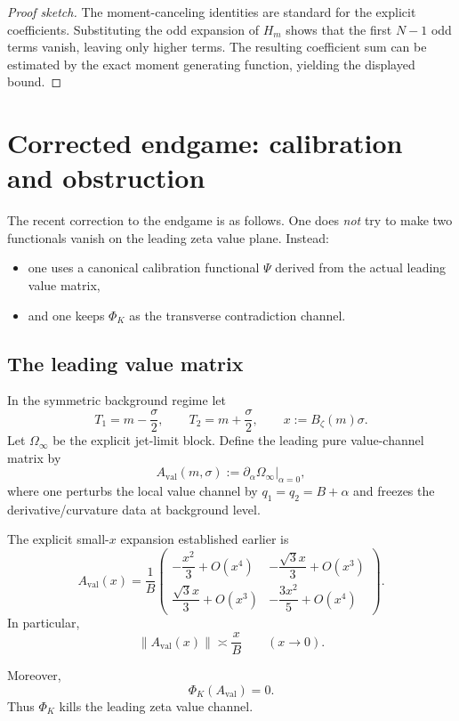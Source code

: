 \documentclass[11pt]{article}
\theoremstyle{plain}
\theoremstyle{definition}
\newcommand{\Psical}{\Psi}
\newcommand{\val}{\mathrm{val}}
\newcommand{\Aval}{A_{\val}}
\newcommand{\norm}[1]{\left\lVert #1\right\rVert}
\begin{document}
\begin{proof}[Proof sketch]
The moment-canceling identities are standard for the explicit coefficients. Substituting the odd expansion of $H_m$ shows that the first $N-1$ odd terms vanish, leaving only higher terms. The resulting coefficient sum can be estimated by the exact moment generating function, yielding the displayed bound.
\end{proof}

\section{Corrected endgame: calibration and obstruction}

The recent correction to the endgame is as follows. One does \emph{not} try to make two functionals vanish on the leading zeta value plane. Instead:

\begin{itemize}[nosep]
\item one uses a canonical calibration functional $\Psical$ derived from the actual leading value matrix,
\item and one keeps $\Phi_K$ as the transverse contradiction channel.
\end{itemize}

\subsection{The leading value matrix}

In the symmetric background regime let
\[
T_1=m-\frac{\sigma}{2},\qquad T_2=m+\frac{\sigma}{2},\qquad x:=B_\zeta(m)\sigma.
\]
Let $\Omega_\infty$ be the explicit jet-limit block. Define the leading pure value-channel matrix by
\[
\Aval(m,\sigma):=\partial_\alpha \Omega_\infty\big|_{\alpha=0},
\]
where one perturbs the local value channel by $q_1=q_2=B+\alpha$ and freezes the derivative/curvature data at background level.

The explicit small-$x$ expansion established earlier is
\[
\Aval(x)=\frac1{B}
\begin{pmatrix}
-\dfrac{x^2}{3}+O(x^4) & -\dfrac{\sqrt3 x}{3}+O(x^3)\\[1.2ex]
\dfrac{\sqrt3 x}{3}+O(x^3) & -\dfrac{3x^2}{5}+O(x^4)
\end{pmatrix}.
\]
In particular,
\[
\norm{\Aval(x)}\asymp \frac{x}{B}
\qquad(x\to 0).
\]

Moreover,
\[
\Phi_K(\Aval)=0.
\]
Thus $\Phi_K$ kills the leading zeta value channel.
\end{document}
